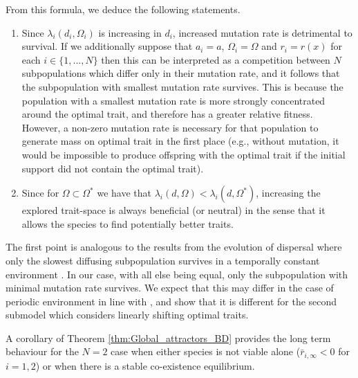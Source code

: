 \documentclass{article}
\begin{document}
From this formula, we deduce the following statements.
\begin{enumerate}
    \item  Since $\lambda_i(d_i,\Omega_i)$ is increasing in $d_i$, increased mutation rate is detrimental to survival. If we additionally suppose that $a_i=a$, $\Omega_i=\Omega$ and $r_i=r(x)$ for each $i\in\{1,...,N\}$ then this can be interpreted as a competition between $N$ subpopulations which differ only in their mutation rate, and it follows that the subpopulation with smallest mutation rate survives. {This is because the population with a smallest mutation rate is more strongly concentrated around the optimal trait, and therefore has a greater relative fitness. However, a non-zero mutation rate is necessary for that population to generate mass on optimal trait in the first place (e.g., without mutation, it would be impossible to produce offspring with the optimal trait if the initial support did not contain the optimal trait).}
   
    
    \item Since for $\Omega\subset\Omega^*$ we have that $\lambda_i(d,\Omega)<\lambda_i(d,\Omega^{*})$, increasing the explored trait-space is always beneficial (or neutral) in the sense that it allows the species to find potentially better traits.
\end{enumerate}
The first point is analogous to the results from the evolution of dispersal  where only the slowest diffusing subpopulation survives in a temporally constant environment \cite{dockery1998evolution,cantrell2021evolution}. In our case, with all else being equal, only the subpopulation with minimal mutation rate survives. We expect that this may differ in the case of periodic environment in line with \cite{liu2022new}, and show that it is different for the second submodel which considers linearly shifting optimal traits.



A corollary of Theorem \ref{thm:Global_attractors_BD} provides the long term behaviour for the $N=2$ case when either species is not viable alone ($\bar{r}_{i,\infty}<0$ for $i=1,2$) or when there is a stable co-existence equilibrium. 
\end{document}

